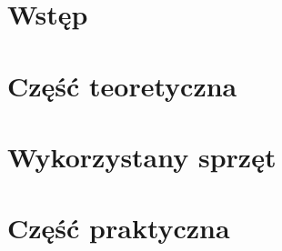 \documentclass[pdflatex,12pt]{aghdpl}
\author{Michał Mąka}
\date{2013}
\begin{document}
\titlepages

\tableofcontents
\clearpage

\part*{Wstęp}



\part{Część teoretyczna}



\part{Wykorzystany sprzęt}




\part{Część praktyczna}











 \appendix
 
% 
\end{document}
